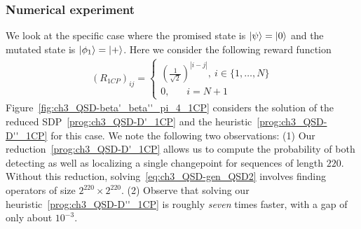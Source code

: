 \subsubsection{Numerical experiment}

We look at the specific case where the promised state is $\ket{\psi} = \ket{0}$ and the mutated state is $\ket{\phi_1} = \ket{+}$.
Here we consider the following reward function
\begin{align}
    \label{eq:ch3_QSD-1CP_ctbr}
    (R_{1CP})_{ij} = 
    \begin{cases}
        \left( \frac{1}{\sqrt{2}} \right)^{|i - j|},\ i \in \{1, \dots, N\} \\
        0,\ \hspace{15pt}\ i = N + 1
    \end{cases}
\end{align}
Figure~\ref{fig:ch3_QSD-beta'_beta''_pi_4_1CP} considers the solution of the reduced SDP~\eqref{prog:ch3_QSD-D'_1CP} and the heuristic~\eqref{prog:ch3_QSD-D''_1CP} for this case.
We note the following two observations:
(1) Our reduction~\eqref{prog:ch3_QSD-D'_1CP} allows us to compute the probability of both detecting as well as localizing a single changepoint for sequences of length $220$.
Without this reduction, solving~\eqref{eq:ch3_QSD-gen_QSD2} involves finding operators of size $2^{220} \times 2^{220}$.
(2) Observe that solving our heuristic~\eqref{prog:ch3_QSD-D''_1CP} is roughly \emph{seven} times faster, with a gap of only about $10^{-3}$.

